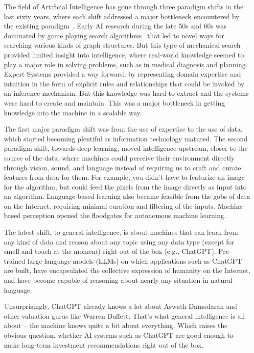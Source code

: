 \documentclass[]{interact}
\theoremstyle{plain}%
\theoremstyle{definition}
\theoremstyle{remark}
\begin{document}
The field of Artificial Intelligence has gone through three paradigm shifts in the last sixty years, where each shift addressed a major bottleneck encountered by the existing paradigm~\citep{dhar2024paradigm}. Early AI research during the late 50s and 60s was dominated by game playing search algorithms~\citep{samuel1959some} that led to novel ways for searching various kinds of graph structures. But this type of mechanical search provided limited insight into intelligence, where real-world knowledge seemed to play a major role in solving problems, such as in medical diagnosis and planning. Expert Systems provided a way forward, by representing domain expertise and intuition in the form of explicit rules and relationships that could be invoked by an inference mechanism. But this knowledge was hard to extract and the systems were hard to create and maintain. This was a major bottleneck in getting knowledge into the machine in a scalable way.

The first major paradigm shift was from the use of expertise to the use of data, which started becoming plentiful as information technology matured. The second paradigm shift, towards deep learning, moved intelligence upstream, closer to the source of the data, where machines could perceive their environment directly through vision, sound, and language instead of requiring us to craft and curate features from data for them. For example, you didn't have to featurize an image for the algorithm, but could feed the pixels from the image directly as input into an algorithm. Language-based learning also became feasible from the gobs of data on the Internet, requiring minimal curation and filtering of the inputs. Machine-based perception opened the floodgates for autonomous machine learning.

The latest shift, to general intelligence, is about machines that can learn from any kind of data and reason about any topic using any data type (except for smell and touch at the moment) right out of the box (e.g., ChatGPT).  Pre-trained large language models (LLMs) on which applications such as ChatGPT are built, have encapsulated the collective expression of humanity on the Internet, and have become capable of reasoning about nearly any situation in natural language.

Unsurprisingly, ChatGPT already knows a lot about Aswath Damodaran and other valuation gurus like Warren Buffett. That's what general intelligence is all about – the machine knows quite a bit about everything. Which raises the obvious question, whether AI systems such as ChatGPT are good enough to make long-term investment recommendations right out of the box. 
\end{document}

